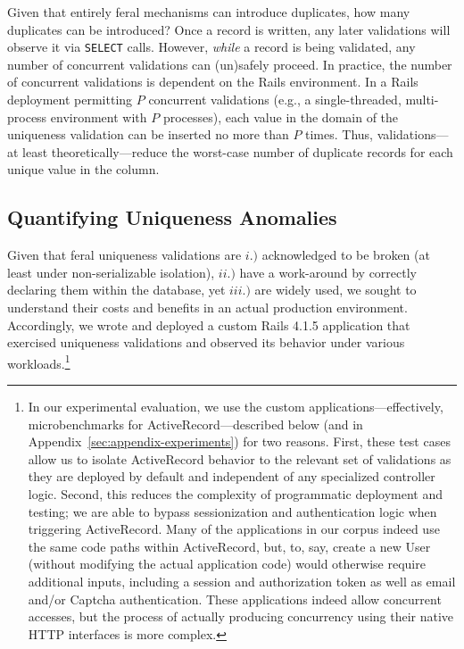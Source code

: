  Given that entirely feral
mechanisms can introduce duplicates, how many duplicates can be
introduced? Once a record is written, any later validations will
observe it via \texttt{SELECT} calls. However, \textit{while} a record
is being validated, any number of concurrent validations can
(un)safely proceed. In practice, the number of concurrent validations
is dependent on the Rails environment. In a Rails deployment
permitting $P$ concurrent validations (e.g., a single-threaded,
multi-process environment with $P$ processes), each value in the
domain of the uniqueness validation can be inserted no more than $P$
times. Thus, validations---at least theoretically---reduce the
worst-case number of duplicate records for each unique value in the
column.

\subsection{Quantifying Uniqueness Anomalies}

Given that feral uniqueness validations are $i.)$ acknowledged to be
broken (at least under non-serializable isolation), $ii.)$ have a
work-around by correctly declaring them within the database, yet
$iii.)$ are widely used, we sought to understand their costs and
benefits in an actual production environment. Accordingly, we wrote
and deployed a custom Rails 4.1.5 application that exercised
uniqueness validations and observed its behavior under various
workloads.\footnote{In our experimental evaluation, we use the custom
  applications---effectively, microbenchmarks for
  ActiveRecord---described below (and in
  Appendix~\ref{sec:appendix-experiments}) for two reasons. First,
  these test cases allow us to isolate ActiveRecord behavior to the
  relevant set of validations as they are deployed by default and
  independent of any specialized controller logic. Second, this
  reduces the complexity of programmatic deployment and testing; we
  are able to bypass sessionization and authentication logic when
  triggering ActiveRecord. Many of the applications in our corpus
  indeed use the same code paths within ActiveRecord, but, to, say,
  create a new User (without modifying the actual application code)
  would otherwise require additional inputs, including a session and
  authorization token as well as email and/or Captcha
  authentication. These applications indeed allow concurrent accesses,
  but the process of actually producing concurrency using their native
  HTTP interfaces is more complex.}

